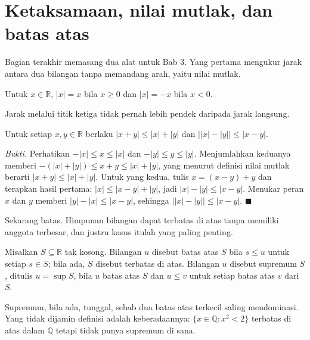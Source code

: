 \section{Ketaksamaan, nilai mutlak, dan batas atas}

Bagian terakhir memasang dua alat untuk Bab 3. Yang pertama mengukur jarak antara dua
bilangan tanpa memandang arah, yaitu nilai mutlak.

\begin{definisi}
Untuk $x \in \mathbb{R}$, $|x| = x$ bila $x \ge 0$ dan $|x| = -x$ bila $x < 0$.
\end{definisi}

Jarak melalui titik ketiga tidak pernah lebih pendek daripada jarak langsung.

\begin{proposisi}
Untuk setiap $x, y \in \mathbb{R}$ berlaku $|x + y| \le |x| + |y|$ dan
$\bigl| |x| - |y| \bigr| \le |x - y|$.
\end{proposisi}
\par\smallskip\noindent\textit{Bukti.} Perhatikan $-|x| \le x \le |x|$ dan
$-|y| \le y \le |y|$. Menjumlahkan keduanya memberi
$-(|x|+|y|) \le x + y \le |x|+|y|$, yang menurut definisi nilai mutlak berarti
$|x+y| \le |x|+|y|$. Untuk yang kedua, tulis $x = (x-y) + y$ dan terapkan hasil
pertama: $|x| \le |x-y| + |y|$, jadi $|x| - |y| \le |x-y|$. Menukar peran $x$ dan $y$
memberi $|y| - |x| \le |x-y|$, sehingga $\bigl| |x| - |y| \bigr| \le |x-y|$.
\hfill$\blacksquare${\parfillskip=0pt\par}

Sekarang batas. Himpunan bilangan dapat terbatas di atas tanpa memiliki anggota
terbesar, dan justru kasus itulah yang paling penting.

\begin{definisi}
Misalkan $S \subseteq \mathbb{R}$ tak kosong. Bilangan $u$ disebut batas atas $S$
bila $s \le u$ untuk setiap $s \in S$; bila ada, $S$ disebut terbatas di atas.
Bilangan $u$ disebut supremum $S$, ditulis $u = \sup S$, bila $u$ batas atas $S$ dan
$u \le v$ untuk setiap batas atas $v$ dari $S$.
\end{definisi}


Supremum, bila ada, tunggal, sebab dua batas atas terkecil saling mendominasi. Yang
tidak dijamin definisi adalah keberadaannya: $\{x \in \mathbb{Q} : x^{2} < 2\}$
terbatas di atas dalam $\mathbb{Q}$ tetapi tidak punya supremum di sana.


